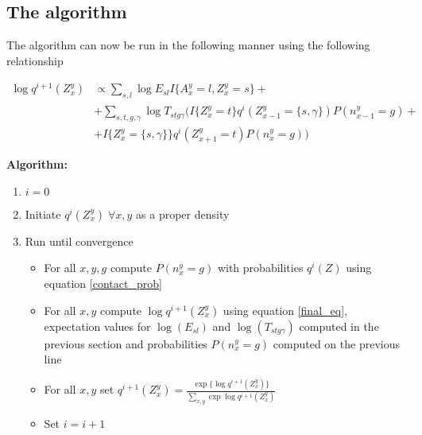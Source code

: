 \subsection*{The algorithm}
The algorithm can now be run in the following manner using the following relationship

\begin{align}
  \log q^{i+1}(Z_x^y) & \propto \sum_{s,l} \log E_{sl} I\{A_x^y=l, Z_x^y=s\} + \\
  & + \sum_{s,t,g,\gamma} \log T_{stg\gamma} \bigg( I\{Z_x^y = t\}q^{i}(Z_{x-1}^y = \{s,\gamma\})P(n_{x-1}^y = g) + \nonumber \\
  & + I\{Z_x^y = \{s,\gamma\}\}q^{i}(Z_{x+1}^y = t)P(n_x^y = g) \bigg)
\end{align}

\textbf{Algorithm:}
\begin{enumerate}
  \item $i = 0$
  \item Initiate $q^{i}(Z_x^y) \; \forall x,y$ as a proper density
  \item Run until convergence \begin{itemize}
    \item For all $x,y,g$ compute $P(n_x^y = g)$ with probabilities $q^{i}(Z)$ using equation \eqref{contact_prob}
    \item For all $x,y$ compute $\log q^{i+1}(Z_x^y)$ using equation \eqref{final_eq}, expectation values for $\log(E_{sl})$ and $\log(T_{stg\gamma})$ computed in the previous section and probabilities $P(n_x^y = g)$ computed on the previous line
    \item For all $x,y$ set $q^{i+1}(Z_x^y) = \frac{\exp\{\log q^{i+1}(Z_x^y)\}}{\sum_{x,y}\exp{\log q^{i+1}(Z_x^y)}}$
    \item Set $i = i + 1$

  \end{itemize}
\end{enumerate}
